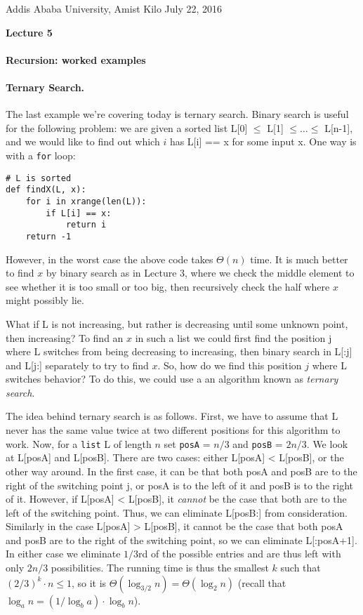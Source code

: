 \documentclass[11pt]{article}
\newlength{\toppush}
\newcommand{\htitle}[2]{\noindent\vspace*{-\toppush}\newline\parbox{6.5in}
 {\large Addis Ababa University, Amist Kilo \hfill #1\newline
\hspace*{\fill}{\bf Algorithms and Programming for High Schoolers} \hspace*{\fill} \newline
\mbox{}\hrulefill\mbox{}}\vspace*{1ex}\mbox{}\newline
\begin{center}{\Large\bf #2}\end{center}}
\begin{document}
\htitle{July 22, 2016}{Lecture 5}

\paragraph{Recursion: worked examples}

\paragraph{Ternary Search.}
The last example we're covering today is ternary search.  Binary
search is useful for the following problem: we are given a sorted list
L[0] $\le$ L[1] $\le \ldots \le$ L[n-1], and we would like to find out
which $i$ has L[i] == x for some input x.  One way is with a
\texttt{for} loop:

\begin{verbatim}
# L is sorted
def findX(L, x):
    for i in xrange(len(L)):
        if L[i] == x:
            return i
    return -1
\end{verbatim}

However, in the worst case the above code takes $\Theta(n)$ time.  It
is much better to find $x$ by binary search as in Lecture 3, where we
check the middle element to see whether it is too small or too big,
then recursively check the half where $x$ might possibly lie.

What if L is not increasing, but rather is decreasing until some
unknown point, then increasing?  To find an $x$ in such a list we could
first find the position j where L switches from being decreasing to
increasing, then binary search in L[:j] and L[j:] separately to try to
find $x$.  So, how do we find this position $j$ where L switches
behavior?  To do this, we could use a an algorithm known as {\em
  ternary search}.

The idea behind ternary search is as follows.  First, we have to
assume that L never has the same value twice at two different
positions for this algorithm to work.  Now, for a \texttt{list} L of
length $n$ set \texttt{posA} = $n/3$ and \texttt{posB} = $2n/3$.  We
look at L[posA] and L[posB].  There are two cases: either L[posA] <
L[posB], or the other way around.  In the first case, it can be that
both posA and posB are to the right of the switching point j, or posA
is to the left of it and posB is to the right of it.  However, if
L[posA] < L[posB], it {\em cannot} be the case that both are to the
left of the switching point.  Thus, we can eliminate L[posB:] from
consideration.  Similarly in the case L[posA] > L[posB], it cannot be
the case that both posA and posB are to the right of the switching
point, so we can eliminate L[:posA+1].  In either case we eliminate
$1/3$rd of the possible entries and are thus left with only $2n/3$
possibilities.  The running time is thus the smallest $k$ such that
$(2/3)^k \cdot n \le 1$, so it is $\Theta(\log_{3/2} n)  =
\Theta(\log_2 n)$ (recall that $\log_a n = (1/\log_b a)\cdot \log_b
n$).
\end{document}
